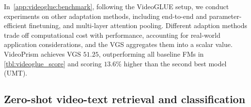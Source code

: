 \documentclass{article}
\theoremstyle{plain}
\theoremstyle{definition}
\theoremstyle{remark}
\newcommand{\OURS}{VideoPrism\xspace}
\begin{document}
In~\cref{app:videoglue:benchmark}, following the VideoGLUE setup, we conduct experiments on other adaptation methods, including end-to-end and parameter-efficient finetuning, and multi-layer attention pooling. Different adaption methods trade off computational cost with performance, accounting for real-world application considerations, and the VGS aggregates them into a scalar value. \OURS achieves VGS $51.25$, outperforming all baseline FMs in \cref{tbl:videoglue_score} and scoring $13.6\%$ higher than the second best model (UMT). 


\subsection{Zero-shot video-text retrieval and classification}
\label{sec:exp:vt_retrieval}
\end{document}
